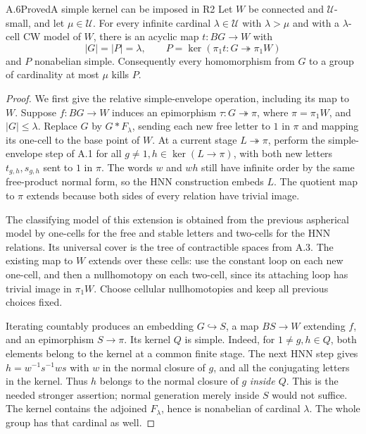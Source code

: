 \begin{claim}{A.6}{Proved}{A simple kernel can be imposed in R2}
Let $W$ be connected and $\mathcal U$-small, and let $\mu\in\mathcal U$.
For every infinite cardinal $\lambda\in\mathcal U$ with
$\lambda>\mu$ and with a $\lambda$-cell CW model of $W$, there is an
acyclic map $t:BG\to W$ with
\[
 |G|=|P|=\lambda,\qquad
 P=\ker(\pi_1t:G\twoheadrightarrow\pi_1W)
\]
and $P$ nonabelian simple. Consequently every homomorphism from $G$
to a group of cardinality at most $\mu$ kills $P$.
\end{claim}
\begin{proof}
We first give the relative simple-envelope operation, including its
map to $W$. Suppose $f:BG\to W$ induces an epimorphism
$\tau:G\twoheadrightarrow\pi$, where $\pi=\pi_1W$, and $|G|\leq\lambda$.
Replace $G$ by $G*F_\lambda$, sending each new free letter to $1$ in
$\pi$ and mapping its one-cell to the base point of $W$. At a current
stage $L\twoheadrightarrow\pi$, perform the simple-envelope step of
A.1 for all $g\ne1,h\in\ker(L\to\pi)$, with both new letters
$t_{g,h},s_{g,h}$ sent to $1$ in $\pi$. The words $w$ and $wh$ still
have infinite order by the same free-product normal form, so the HNN
construction embeds $L$. The quotient map to $\pi$ extends because
both sides of every relation have trivial image.

The classifying model of this extension is obtained from the previous
aspherical model by one-cells for the free and stable letters and
two-cells for the HNN relations. Its universal cover is the tree of
contractible spaces from A.3. The existing map to $W$ extends over
these cells: use the constant loop on each new one-cell, and then a
nullhomotopy on each two-cell, since its attaching loop has trivial
image in $\pi_1W$. Choose cellular nullhomotopies and keep all previous
choices fixed.

Iterating countably produces an embedding $G\hookrightarrow S$, a
map $BS\to W$ extending $f$, and an epimorphism $S\to\pi$.
Its kernel $Q$ is simple. Indeed, for $1\ne g,h\in Q$, both elements
belong to the kernel at a common finite stage. The next HNN step gives
$h=w^{-1}s^{-1}ws$ with $w$ in the normal closure of $g$, and all the
conjugating letters in the kernel. Thus $h$ belongs to the normal
closure of $g$ \emph{inside $Q$}. This is the needed stronger assertion;
normal generation merely inside $S$ would not suffice. The kernel
contains the adjoined $F_\lambda$, hence is nonabelian of cardinal
$\lambda$. The whole group has that cardinal as well.


\end{proof}

